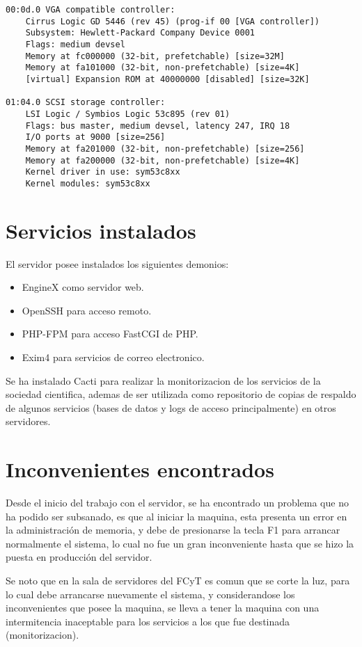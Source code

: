 \documentclass[letterpaper,11pt]{article}
\begin{document}
\begin{verbatim}
00:0d.0 VGA compatible controller:
    Cirrus Logic GD 5446 (rev 45) (prog-if 00 [VGA controller])
    Subsystem: Hewlett-Packard Company Device 0001
    Flags: medium devsel
    Memory at fc000000 (32-bit, prefetchable) [size=32M]
    Memory at fa101000 (32-bit, non-prefetchable) [size=4K]
    [virtual] Expansion ROM at 40000000 [disabled] [size=32K]

01:04.0 SCSI storage controller:
    LSI Logic / Symbios Logic 53c895 (rev 01)
    Flags: bus master, medium devsel, latency 247, IRQ 18
    I/O ports at 9000 [size=256]
    Memory at fa201000 (32-bit, non-prefetchable) [size=256]
    Memory at fa200000 (32-bit, non-prefetchable) [size=4K]
    Kernel driver in use: sym53c8xx
    Kernel modules: sym53c8xx
\end{verbatim}

\section{Servicios instalados}
El servidor posee instalados los siguientes demonios:

\begin{itemize}
\item EngineX como servidor web.
\item OpenSSH para acceso remoto.
\item PHP-FPM para acceso FastCGI de PHP.
\item Exim4 para servicios de correo electronico.
\end{itemize}

Se ha instalado Cacti para realizar la monitorizacion de los servicios de la
sociedad cientifica, ademas de ser utilizada como repositorio de copias de
respaldo de algunos servicios (bases de datos y logs de acceso principalmente)
en otros servidores.

\section{Inconvenientes encontrados}
Desde el inicio del trabajo con el servidor, se ha encontrado un problema que no
ha podido ser subsanado, es que al iniciar la maquina, esta presenta un error
en la administración de memoria, y debe de presionarse la tecla F1 para arrancar
normalmente el sistema, lo cual no fue un gran inconveniente hasta que se hizo
la puesta en producción del servidor.

Se noto que en la sala de servidores del FCyT es comun que se corte la luz, para
lo cual debe arrancarse nuevamente el sistema, y considerandose los
inconvenientes que posee la maquina, se lleva a tener la maquina con una
intermitencia inaceptable para los servicios a los que fue destinada
(monitorizacion).
\end{document}
